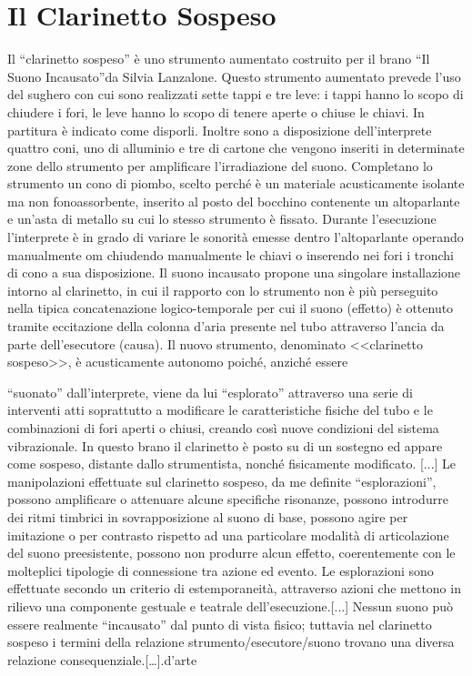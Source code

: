 \section{Il Clarinetto Sospeso}

Il “clarinetto sospeso” è uno strumento aumentato costruito per il brano “Il Suono Incausato”da Silvia Lanzalone.
Questo strumento aumentato prevede l’uso del sughero con cui sono realizzati sette tappi e tre leve: i tappi hanno lo scopo di chiudere i fori, le  leve hanno lo scopo di tenere aperte o chiuse le chiavi. In partitura è indicato come disporli.
Inoltre sono a disposizione dell’interprete quattro coni, uno di alluminio e tre di cartone che vengono inseriti in determinate zone dello strumento per amplificare l’irradiazione del suono.
Completano lo strumento un cono di piombo, scelto perché è un materiale acusticamente isolante ma non fonoassorbente, inserito al posto del bocchino contenente un altoparlante e un’asta di metallo su cui lo stesso strumento è fissato.
Durante l’esecuzione l’interprete è in grado di variare le sonorità emesse dentro l’altoparlante operando manualmente om chiudendo manualmente le chiavi o inserendo nei fori i tronchi di cono a sua disposizione.
Il suono incausato propone una singolare installazione intorno al clarinetto, in cui il rapporto con lo strumento non è più perseguito nella tipica concatenazione logico-temporale per cui il suono (effetto) è ottenuto tramite eccitazione della colonna d’aria presente nel tubo attraverso l’ancia da parte dell’esecutore (causa). Il nuovo strumento, denominato <<clarinetto sospeso>>, è acusticamente autonomo poiché, anziché essere 



“suonato” dall’interprete, viene da lui “esplorato” attraverso una serie di interventi atti soprattutto a modificare le caratteristiche fisiche del tubo e le combinazioni di fori aperti o chiusi, creando così nuove condizioni del sistema vibrazionale. In questo brano il clarinetto è posto su di un sostegno ed appare come sospeso, distante dallo strumentista, nonché fisicamente modificato. [...] Le manipolazioni effettuate sul clarinetto sospeso, da me definite “esplorazioni”, possono amplificare o attenuare alcune specifiche risonanze, possono introdurre dei ritmi timbrici in sovrapposizione al suono di base, possono agire per imitazione o per contrasto rispetto ad una particolare modalità di articolazione del suono preesistente, possono non produrre alcun effetto, coerentemente con le molteplici tipologie di connessione tra azione ed evento. Le esplorazioni sono effettuate secondo un criterio di estemporaneità, attraverso azioni che mettono in rilievo una componente gestuale e teatrale dell’esecuzione.[...]
Nessun suono può essere realmente “incausato” dal punto di vista fisico; tuttavia nel clarinetto sospeso i termini della relazione strumento/esecutore/suono trovano una diversa relazione consequenziale.[…].d’arte

